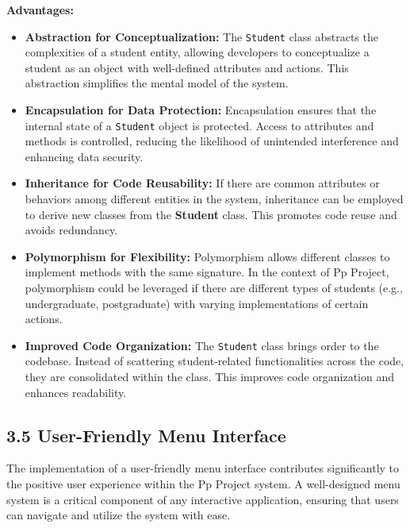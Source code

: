 \documentclass{article}
\begin{document}
\textbf{Advantages:}
\begin{itemize}
    \item \textbf{Abstraction for Conceptualization:} The \texttt{Student} class abstracts the complexities of a student entity, 
    allowing developers to conceptualize a student as an object with well-defined attributes and actions. 
    This abstraction simplifies the mental model of the system.
    \item \textbf{Encapsulation for Data Protection:} Encapsulation ensures that the internal state of a \texttt{Student} object is protected. 
    Access to attributes and methods is controlled, reducing the likelihood of unintended interference and enhancing data security.
    \item \textbf{Inheritance for Code Reusability:} If there are common attributes or behaviors among different entities 
    in the system, inheritance can be employed to derive new classes from the \textbf{Student} class. This promotes code reuse and avoids redundancy.
    \item \textbf{Polymorphism for Flexibility:} Polymorphism allows different classes to implement methods with the same signature. 
    In the context of Pp Project, polymorphism could be leveraged if there are different types of students (e.g., undergraduate, postgraduate) with varying implementations of certain actions.
    \item \textbf{Improved Code Organization:} The \texttt{Student} class brings order to the codebase. 
    Instead of scattering student-related functionalities across the code, they are consolidated within the class. This improves code organization and enhances readability.
\end{itemize}

\subsection*{\textbf{3.5 User-Friendly Menu Interface}}

The implementation of a user-friendly menu interface contributes significantly to the positive user experience within the Pp Project system. 
A well-designed menu system is a critical component of any interactive application, ensuring that users can navigate and utilize the system with ease.
\end{document}
